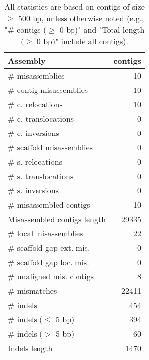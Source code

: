 \documentclass[12pt,a4paper]{article}
\begin{document}
\begin{table}[ht]
\begin{center}
\caption{All statistics are based on contigs of size $\geq$ 500 bp, unless otherwise noted (e.g., "\# contigs ($\geq$ 0 bp)" and "Total length ($\geq$ 0 bp)" include all contigs).}
\begin{tabular}{|l*{1}{|r}|}
\hline
Assembly & contigs \\ \hline
\# misassemblies & 10 \\ \hline
\hspace{2mm}\# contig misassemblies & 10 \\ \hline
\hspace{5mm}\# c. relocations & 10 \\ \hline
\hspace{5mm}\# c. translocations & 0 \\ \hline
\hspace{5mm}\# c. inversions & 0 \\ \hline
\hspace{2mm}\# scaffold misassemblies & 0 \\ \hline
\hspace{5mm}\# s. relocations & 0 \\ \hline
\hspace{5mm}\# s. translocations & 0 \\ \hline
\hspace{5mm}\# s. inversions & 0 \\ \hline
\# misassembled contigs & 10 \\ \hline
Misassembled contigs length & 29335 \\ \hline
\# local misassemblies & 22 \\ \hline
\# scaffold gap ext. mis. & 0 \\ \hline
\# scaffold gap loc. mis. & 0 \\ \hline
\# unaligned mis. contigs & 8 \\ \hline
\# mismatches & 22411 \\ \hline
\# indels & 454 \\ \hline
\hspace{5mm}\# indels ($\leq$ 5 bp) & 394 \\ \hline
\hspace{5mm}\# indels ($>$ 5 bp) & 60 \\ \hline
Indels length & 1470 \\ \hline
\end{tabular}
\end{center}
\end{table}
\end{document}
